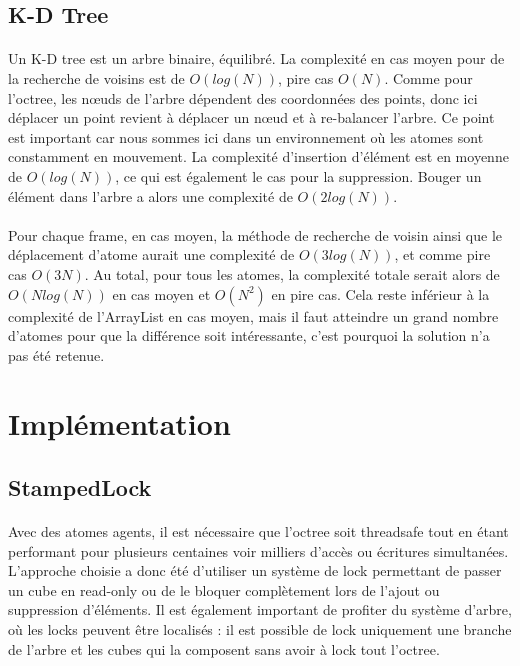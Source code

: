 \subsection{K-D Tree}

\paragraph{}
Un K-D tree est un arbre binaire, équilibré. La complexité en cas moyen pour de
la recherche de voisins est de $O(log(N))$, pire cas $O(N)$. Comme pour
l'octree, les nœuds de l'arbre dépendent des coordonnées des points, donc ici
déplacer un point revient à déplacer un nœud et à re-balancer l'arbre. Ce point
est important car nous sommes ici dans un environnement où les atomes sont
constamment en mouvement.  La complexité d'insertion d'élément est en moyenne
de $O(log(N))$, ce qui est également le cas pour la suppression. Bouger un
élément dans l'arbre a alors une complexité de $O(2log(N))$.

\paragraph{}
Pour chaque frame, en cas moyen, la méthode de recherche de voisin ainsi que le
déplacement d'atome aurait une complexité de $O(3log(N))$, et comme pire cas
$O(3N)$. Au total, pour tous les atomes, la complexité totale serait alors de
$O(Nlog(N))$ en cas moyen et $O(N^2)$ en pire cas. Cela reste inférieur à la
complexité de l'ArrayList en cas moyen, mais il faut atteindre un grand nombre
d'atomes pour que la différence soit intéressante, c'est pourquoi la solution
n'a pas été retenue.


\section{Implémentation}

\subsection{StampedLock}
\paragraph{}
Avec des atomes agents, il est nécessaire que l'octree soit threadsafe tout en
étant performant pour plusieurs centaines voir milliers d'accès ou écritures
simultanées. L'approche choisie a donc été d'utiliser un système de lock
permettant de passer un cube en read-only ou de le bloquer complètement lors
de l'ajout ou suppression d'éléments. Il est également important de profiter du
système d'arbre, où les locks peuvent être localisés : il est possible de lock
uniquement une branche de l'arbre et les cubes qui la composent sans avoir à
lock tout l'octree.

